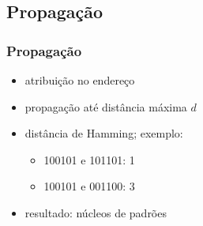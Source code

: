 \documentclass{beamer}
\begin{document}
\subsection{Propagação}
\begin{frame}
    \frametitle{Propagação}
    \begin{itemize}
        \item atribuição no endereço
        \item propagação até distância máxima $d$
        \item distância de Hamming; exemplo:
            \begin{itemize}
                \item 10\alert 0101 e 10\alert 1101: 1
                \item \alert 10\alert 010\alert 1 e \alert 00\alert 110\alert 0: 3
            \end{itemize}
        \item resultado: núcleos de padrões
    \end{itemize}
\end{frame}
\end{document}
